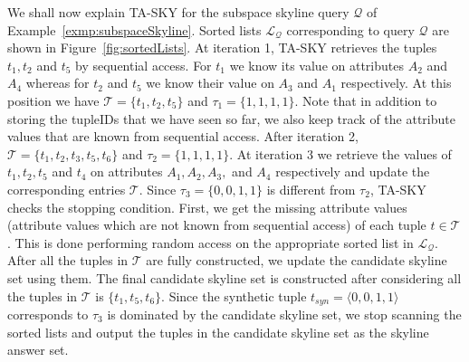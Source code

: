 We shall now explain TA-SKY for the subspace skyline query $\mathcal{Q}$ of Example~\ref{exmp:subspaceSkyline}. Sorted lists $\mathcal{L_Q}$ corresponding 
to query $\mathcal{Q}$ are shown in Figure~\ref{fig:sortedLists}. At iteration 1, TA-SKY retrieves the tuples $t_1, t_2$ and $ t_5$ by sequential access. For $t_1$ we know its value on attributes $A_2$ and $A_4$ whereas for $t_2$ and $t_5$ we know their value on $A_3$ and $A_1$ respectively. At this position we have $\mathcal{T} = \{ t_1, t_2, t_5 \}$ and $\tau_1 = \{1, 1, 1, 1\}$. Note that in addition to storing the tupleIDs that we have seen so far, we also keep track of the attribute values that are known from sequential access. After iteration 2,  $\mathcal{T} = \{ t_1, t_2, t_3, t_5, t_6\}$ and $\tau_2 = \{1, 1, 1, 1\}$. At iteration 3 we retrieve the values of $t_1, t_2, t_5$ and $ t_4$ on attributes $A_1, A_2, A_3,$ and $A_4$ respectively and update the corresponding entries $\mathcal{T}$.  Since $\tau_3 = \{0, 0, 1, 1\}$ is different from $\tau_2$, TA-SKY checks the stopping condition. First, we get the missing attribute values (attribute values which are not known from sequential access) of each tuple $t \in \mathcal{T}$. This is done performing random access on the appropriate sorted list in $\mathcal{L_Q}$. After all the tuples in $\mathcal{T}$ are fully constructed, we update the candidate skyline set using them. The final candidate skyline set is constructed after considering all the tuples in $\mathcal{T}$ is $\{t_1, t_5, t_6 \}$. Since the synthetic tuple $t_{syn} = \langle 0, 0, 1, 1 \rangle$ corresponds to $\tau_3$ is dominated by the candidate skyline set, we stop scanning the sorted lists and output the tuples in the candidate skyline set as the skyline answer set.

